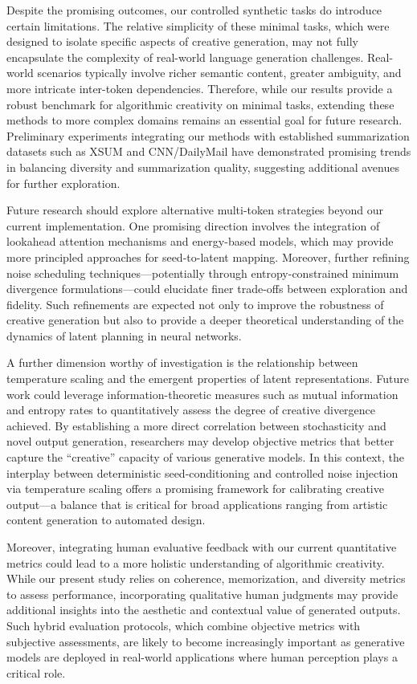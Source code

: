 \documentclass[11pt]{article}
\begin{document}
Despite the promising outcomes, our controlled synthetic tasks do introduce certain limitations. The relative simplicity of these minimal tasks, which were designed to isolate specific aspects of creative generation, may not fully encapsulate the complexity of real-world language generation challenges. Real-world scenarios typically involve richer semantic content, greater ambiguity, and more intricate inter-token dependencies. Therefore, while our results provide a robust benchmark for algorithmic creativity on minimal tasks, extending these methods to more complex domains remains an essential goal for future research. Preliminary experiments integrating our methods with established summarization datasets such as XSUM and CNN/DailyMail have demonstrated promising trends in balancing diversity and summarization quality, suggesting additional avenues for further exploration.

Future research should explore alternative multi-token strategies beyond our current implementation. One promising direction involves the integration of lookahead attention mechanisms and energy-based models, which may provide more principled approaches for seed-to-latent mapping. Moreover, further refining noise scheduling techniques—potentially through entropy-constrained minimum divergence formulations—could elucidate finer trade-offs between exploration and fidelity. Such refinements are expected not only to improve the robustness of creative generation but also to provide a deeper theoretical understanding of the dynamics of latent planning in neural networks.

A further dimension worthy of investigation is the relationship between temperature scaling and the emergent properties of latent representations. Future work could leverage information-theoretic measures such as mutual information and entropy rates to quantitatively assess the degree of creative divergence achieved. By establishing a more direct correlation between stochasticity and novel output generation, researchers may develop objective metrics that better capture the “creative” capacity of various generative models. In this context, the interplay between deterministic seed-conditioning and controlled noise injection via temperature scaling offers a promising framework for calibrating creative output—a balance that is critical for broad applications ranging from artistic content generation to automated design.

Moreover, integrating human evaluative feedback with our current quantitative metrics could lead to a more holistic understanding of algorithmic creativity. While our present study relies on coherence, memorization, and diversity metrics to assess performance, incorporating qualitative human judgments may provide additional insights into the aesthetic and contextual value of generated outputs. Such hybrid evaluation protocols, which combine objective metrics with subjective assessments, are likely to become increasingly important as generative models are deployed in real-world applications where human perception plays a critical role.
\end{document}
